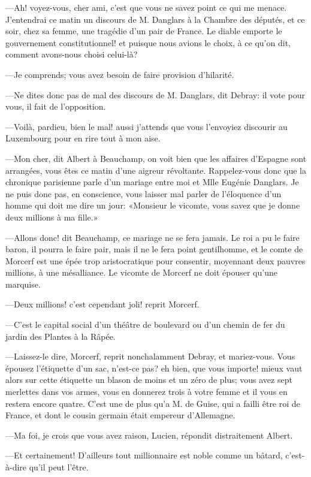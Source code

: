—Ah! voyez-vous, cher ami, c'est que vous ne savez point ce qui me menace. J'entendrai ce matin un discours de M. Danglars à la Chambre des députés, et ce soir, chez sa femme, une tragédie d'un pair de France. Le diable emporte le gouvernement constitutionnel! et puisque nous avions le choix, à ce qu'on dit, comment avons-nous choisi celui-là?  

—Je comprends; vous avez besoin de faire provision d'hilarité. 

—Ne dites donc pas de mal des discours de M. Danglars, dit Debray: il vote pour vous, il fait de l'opposition. 

—Voilà, pardieu, bien le mal! aussi j'attends que vous l'envoyiez discourir au Luxembourg pour en rire tout à mon aise. 

—Mon cher, dit Albert à Beauchamp, on voit bien que les affaires d'Espagne sont arrangées, vous êtes ce matin d'une aigreur révoltante. Rappelez-vous donc que la chronique parisienne parle d'un mariage entre moi et Mlle Eugénie Danglars. Je ne puis donc pas, en conscience, vous laisser mal parler de l'éloquence d'un homme qui doit me dire un jour: «Monsieur le vicomte, vous savez que je donne deux millions à ma fille.» 

—Allons donc! dit Beauchamp, ce mariage ne se fera jamais. Le roi a pu le faire baron, il pourra le faire pair, mais il ne le fera point gentilhomme, et le comte de Morcerf est une épée trop aristocratique pour consentir, moyennant deux pauvres millions, à une mésalliance. Le vicomte de Morcerf ne doit épouser qu'une marquise. 

—Deux millions! c'est cependant joli! reprit Morcerf. 

—C'est le capital social d'un théâtre de boulevard ou d'un chemin de fer du jardin des Plantes à la Râpée. 

—Laissez-le dire, Morcerf, reprit nonchalamment Debray, et mariez-vous. Vous épousez l'étiquette d'un sac, n'est-ce pas? eh bien, que vous importe! mieux vaut alors sur cette étiquette un blason de moins et un zéro de plus; vous avez sept merlettes dans vos armes, vous en donnerez trois à votre femme et il vous en restera encore quatre. C'est une de plus qu'a M. de Guise, qui a failli être roi de France, et dont le cousin germain était empereur d'Allemagne. 

—Ma foi, je crois que vous avez raison, Lucien, répondit distraitement Albert. 

—Et certainement! D'ailleurs tout millionnaire est noble comme un bâtard, c'est-à-dire qu'il peut l'être. 

